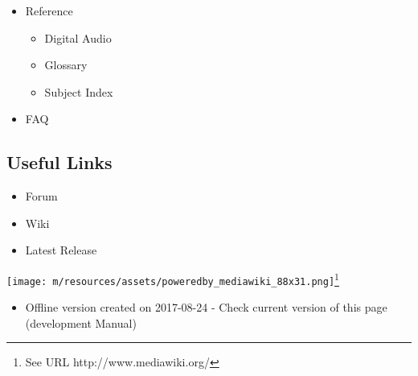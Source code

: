 					\begin{itemize}\item  Reference
\begin{itemize}
\item  Digital Audio
\item  Glossary
\item  Subject Index
\end{itemize}
\item  FAQ
\end{itemize}
										
\subsection{Useful Links}

					\begin{itemize}\item  Forum
\item  Wiki
\item  Latest Release
\end{itemize}
																																											\texttt{[image: m/resources/assets/poweredby\_mediawiki\_88x31.png]}\footnote{See URL http://www.mediawiki.org/}														\begin{itemize}\item Offline version created on 2017-08-24 - Check current version of this page (development Manual)
\end{itemize}
				
